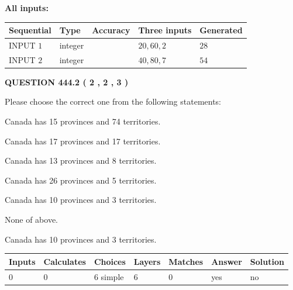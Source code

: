\documentclass[12pt]{article}
\begin{document}
   
   
   
\noindent\vspace{0.1in}\hspace{-0.08in} {\textbf{\Large{All inputs: }}}
   
   
  
  
\noindent\begin{tabular}{|l|l|l|l|l|}
\hline
 Sequential & Type & Accuracy & Three inputs & Generated \\ 
\hline
 
 
  INPUT $  1 $ & integer &  & $
 20
 , 
 60
 , 
 2
 $ & $ 28 $ 
 \\  \hline  
 
 
  INPUT $  2 $ & integer &  & $
 40
 , 
 80
 , 
 7
 $ & $ 54 $ 
 \\  \hline  
 \end{tabular}
   
   
  
\vspace{0.2in}
  
{\textbf{\Large{QUESTION
444.2 
 ( 2 , 2 , 3 )
}}}
  
  
Please choose the correct one from the following statements:
 
 
Canada has  15 provinces and  74 territories.
 
 
Canada has  17 provinces and  17 territories.
 
 
Canada has  13 provinces and  8 territories.
 
 
Canada has  26 provinces and  5 territories.
 
 
Canada has 10  provinces and 3 territories.
 
 
 None of above.
 
 
\noindent{}
 
 
Canada has 10  provinces and 3 territories.
 
 
\noindent{}
 
 
   
   
   
   
\noindent\begin{tabular}{|l|l|l|l|l|l|l|}
 \hline
Inputs & Calculates & Choices & Layers & Matches & Answer & Solution \\ \hline
 0  & 
 0  & 
 6
  simple  
  & 
 6  & 
 0  & 
  yes & 
  no 
  \\ \hline
 \end{tabular}
   
\end{document}
